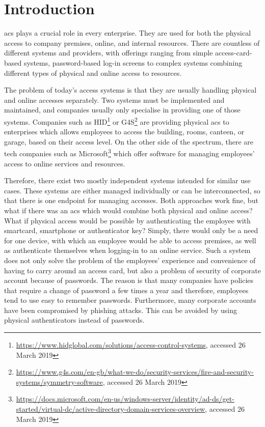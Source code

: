 \section{Introduction}
% 
\acrfull{acs} plays a crucial role in every enterprise. They are used for both the physical access to company premises, online, and internal resources. There are countless of different systems and providers, with offerings ranging from simple access-card-based systems, password-based log-in screens to complex systems combining different types of physical and online access to resources. 

The problem of today’s access systems is that they are usually handling physical and online accesses separately. Two systems must be implemented and maintained, and companies usually only specialise in providing one of those systems. Companies such as HID\footnote{\url{https://www.hidglobal.com/solutions/access-control-systems}, accessed 26 March 2019} or G4S\footnote{\url{https://www.g4s.com/en-gb/what-we-do/security-services/fire-and-security-systems/symmetry-software}, accessed 26 March 2019} are providing physical \acrshort{acs} to enterprises which allows employees to access the building, rooms, canteen, or garage, based on their access level. On the other side of the spectrum, there are tech companies such as Microsoft\footnote{\url{https://docs.microsoft.com/en-us/windows-server/identity/ad-ds/get-started/virtual-dc/active-directory-domain-services-overview}, accessed 26 March 2019} which offer software for managing employees’ access to online services and resources.

Therefore, there exist two mostly independent systems intended for similar use cases. These systems are either managed individually or can be interconnected, so that there is one endpoint for managing accesses. Both approaches work fine, but what if there was an \acrshort{acs} which would combine both physical and online access? What if physical access would be possible by authenticating the employee with smartcard, smartphone or authenticator key? Simply, there would only be a need for one device, with which an employee would be able to access premises, as well as authenticate themselves when logging-in to an online service. Such a system does not only solve the problem of the employees’ experience and convenience of having to carry around an access card, but also a problem of security of corporate account because of passwords. The reason is that many companies have policies that require a change of password a few times a year and therefore, employees tend to use easy to remember passwords. Furthermore, many corporate accounts have been compromised by phishing attacks\cite{Kessem2017CanadianAttacks}. This can be avoided by using physical authenticators instead of passwords.

